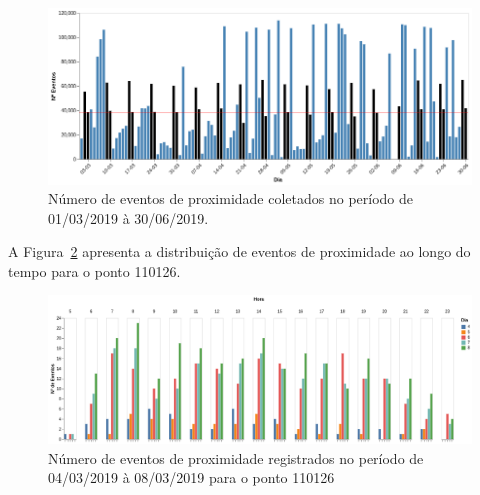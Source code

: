\begin{figure}
\centering
\includegraphics[width=.9\textwidth]{Capitulo4/img/eventos_proximidade.png}
\caption{Número de eventos de proximidade coletados no período de 01/03/2019 à 30/06/2019.}
\label{fig:eventos-de-proximidade}
\end{figure}


A Figura~\ref{fig:eventosproximidade-110126} apresenta a distribuição de eventos de proximidade ao longo do tempo para o ponto 110126.
\begin{figure}
\centering
\includegraphics[width=.9\textwidth]{Capitulo4/img/eventos-proximidade-110126.png}
\caption{Número de eventos de proximidade registrados no período de 04/03/2019 à 08/03/2019 para o ponto 110126}
\label{fig:eventosproximidade-110126}
\end{figure}






